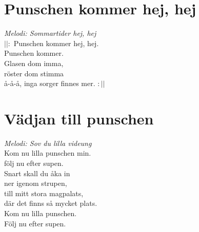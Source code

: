 \section{Punschen kommer hej, hej}
\textit{Melodi: Sommartider hej, hej}
\vspace{2mm}\\
$||:$ Punschen kommer hej, hej.\\
Punschen kommer.\\
Glasen dom imma,\\
röster dom stimma\\
å-å-å, inga sorger finnes mer. $:||$\\

\section{Vädjan till punschen}
\textit{Melodi: Sov du lilla videung}
\vspace{2mm}\\
Kom nu lilla punschen min.\\
följ nu efter supen.\\
Snart skall du åka in\\
ner igenom strupen,\\
till mitt stora magpalats,\\
där det finns så mycket plats.\\
Kom nu lilla punschen.\\
Följ nu efter supen.\\

